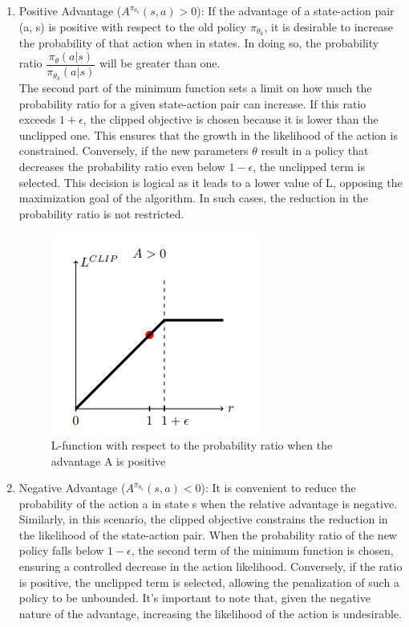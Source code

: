 \documentclass[conference]{IEEEtran}
\begin{document}
\begin{enumerate}
    \item Positive Advantage ($A^{\pi_{\theta_k}}(s, a) > 0$): If the advantage of a state-action pair (a, s) is positive with respect to the old policy $\pi_{\theta_k}$, it is desirable to increase the probability of that action when in states. In doing so, the probability ratio $\dfrac{ \pi_{\theta}(a|s)} { \pi_{\theta_k}(a|s) }$ will be greater than one.\\

    The second part of the minimum function sets a limit on how much the probability ratio for a given state-action pair can increase. If this ratio exceeds $1 + \epsilon$, the clipped objective is chosen because it is lower than the unclipped one. This ensures that the growth in the likelihood of the action is constrained. Conversely, if the new parameters $\theta$ result in a policy that decreases the probability ratio even below $1 - \epsilon$, the unclipped term is selected. This decision is logical as it leads to a lower value of L, opposing the maximization goal of the algorithm. In such cases, the reduction in the probability ratio is not restricted.


    \begin{figure}[!htb]
    \centering
    \includegraphics[width=0.6\columnwidth,keepaspectratio]{RL_project_update/positive.png}
    \caption{L-function with respect to the probability ratio when the
advantage A is positive}
    \label{fig:your_label}
    \end{figure}
    

    \item Negative Advantage ($A^{\pi_{\theta_k}}(s, a) < 0$): It is convenient to reduce the probability of the action a in state s when the relative advantage is negative.\\
    Similarly, in this scenario, the clipped objective constrains the reduction in the likelihood of the state-action pair. When the probability ratio of the new policy falls below $1 - \epsilon$, the second term of the minimum function is chosen, ensuring a controlled decrease in the action likelihood. Conversely, if the ratio is positive, the unclipped term is selected, allowing the penalization of such a policy to be unbounded. It's important to note that, given the negative nature of the advantage, increasing the likelihood of the action is undesirable.


\end{enumerate}
\end{document}
